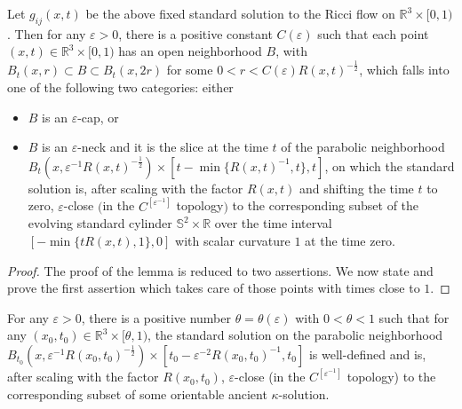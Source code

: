 \begin{lemma}
  \label{lem:cz-standard-solution-canonical-neighborhoods}

Let $g_{ij}(x,t)$ be the above fixed standard solution to the
Ricci flow on $\mathbb{R}^3\times [0,1)$.  Then for any
$\varepsilon>0$, there is a positive constant $C(\varepsilon)$
such that each point $(x,t) \in \mathbb{R}^3\times [0,1)$ has an
open neighborhood $B$, with $B_t(x,r)\subset B \subset B_t(x,2r)$
for some $0<r<C(\varepsilon)R(x,t)^{-\frac{1}{2}}$, which falls
into one of the following two categories: either
\begin{itemize}
\item[(a)] $B$ is  an $\varepsilon$-cap, or \item[(b)] $B$ is an
$\varepsilon$-neck and it is the slice at the time $t$ of the
parabolic neighborhood
$B_t(x,\varepsilon^{-1}R(x,t)^{-\frac{1}{2}}) \times [t-\min
\{R(x,t)^{-1},t\},t]$, on which the standard solution is, after
scaling with the factor $R(x,t)$ and shifting the time $t$ to
zero, $\varepsilon$-close $($in the $C^{[\varepsilon^{-1}]}$
topology$)$ to the corresponding subset of the evolving standard
cylinder $\mathbb{S}^2 \times \mathbb{R}$ over the time interval
$[-\min \{tR(x,t),1\},0]$ with scalar curvature $1$ at the time
zero.
\end{itemize}
\end{lemma}

\begin{proof}
The proof of the lemma is reduced to two assertions. We now state
and prove the first assertion which takes care of those points
with times close to $1$.

\end{proof}

\begin{proposition}
  \label{prop:cz-standard-solution-late-time-ancient-model}

For any $\varepsilon>0$, there is a positive number
$\theta=\theta(\varepsilon)$ with $0<\theta<1$ such that for any
$(x_0,t_0)\in \mathbb{R}^3\times [\theta,1)$, the standard
solution on the parabolic neighborhood
$B_{t_0}(x,\varepsilon^{-1}R(x_0,t_0)^{-\frac{1}{2}}) \times
[t_0-\varepsilon^{-2}R(x_0,t_0)^{-1},t_0]$ is well-defined and is,
after scaling with the factor $R(x_0,t_0)$, $\varepsilon$-close
(in the $C^{[\varepsilon^{-1}]}$ topology) to the corresponding
subset of some orientable ancient $\kappa$-solution.
\end{proposition}

